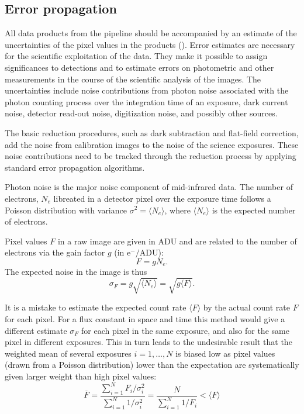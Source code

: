 \subsection{Error propagation}\label{ssec:criticalerrorpropagation}
\label{Sec:critalg_errorprop}

All data products from the pipeline should be accompanied by an
estimate of the uncertainties of the pixel values in the products
(). Error estimates are necessary for the scientific
exploitation of the data. They make it possible to assign
significances to detections and to estimate errors on photometric and
other measurements in the course of the scientific analysis of the
images. The uncertainties include noise contributions from photon
noise associated with the photon counting process over the integration
time of an exposure, dark current noise, detector read-out noise,
digitization noise, and possibly other sources.

The basic reduction procedures, such as dark subtraction and
flat-field correction, add the noise from calibration images to the
noise of the science exposures. These noise contributions need to be
tracked through the reduction process by applying standard error
propagation algorithms.

Photon noise is the major noise component of mid-infrared data. The
number of electrons, $N_{e}$ libreated in a detector pixel over the
exposure time follows a Poisson distribution with variance $\sigma^{2}
= \langle N_{e}\rangle$, where $\langle N_{e}\rangle$ is the expected
number of electrons.

Pixel values $F$ in a raw image are given in ADU and are related to
the number of electrons via the gain factor $g$ (in
$\mathrm{e}^{-}/\mathrm{ADU}$):
\begin{equation}
  \label{eq:gain_def}
  F = g N_{e}.
\end{equation}
The expected noise in the image is thus
\begin{equation}
  \label{eq:noise_adu}
  \sigma_{F} = g\sqrt{\langle N_{e}\rangle} = \sqrt{g \langle F\rangle}.
\end{equation}

It is a mistake to estimate the expected count rate $\langle F\rangle$
by the actual count rate $F$ for each pixel. For a flux constant in
space and time this method would give a different estimate
$\sigma_{F}$ for each pixel in the same exposure, and also for the same pixel
in different exposures. This in turn leads to the undesirable result
that the weighted mean of several exposures $i = 1,\dots, N$ is biased
low as pixel values (drawn from a Poisson distribution) lower than the
expectation are systematically given larger weight than high pixel
values:
\begin{equation}
  \label{eq:weighted_mean}
  \overline{F} = \frac{\sum_{i=1}^{N}
    F_{i}/\sigma_{i}^{2}}{\sum_{i=1}^{N} 1/\sigma_{i}^{2}} =
  \frac{N}{\sum_{i=1}^{N}1/F_{i}} < \langle F\rangle
\end{equation}

